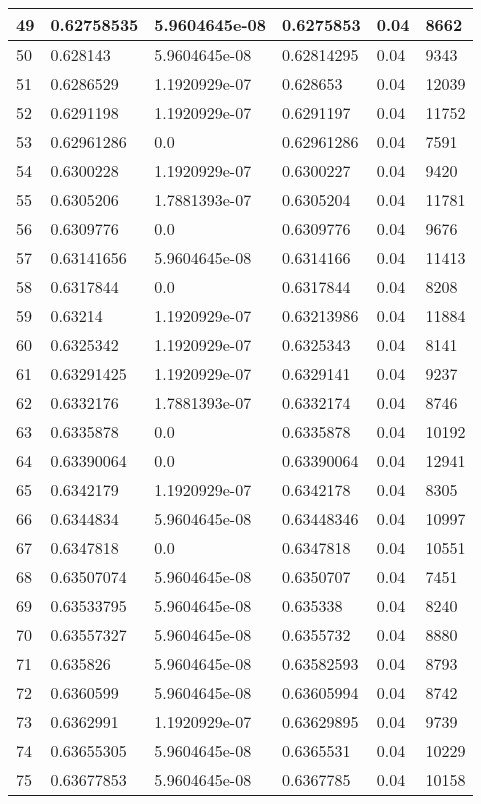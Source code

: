 \begin{longtable}{|l|l|l|l|l|l|}
49 & 0.62758535 & 5.9604645e-08 & 0.6275853 & 0.04 & 8662 \\ \hline 
50 & 0.628143 & 5.9604645e-08 & 0.62814295 & 0.04 & 9343 \\ \hline 
51 & 0.6286529 & 1.1920929e-07 & 0.628653 & 0.04 & 12039 \\ \hline 
52 & 0.6291198 & 1.1920929e-07 & 0.6291197 & 0.04 & 11752 \\ \hline 
53 & 0.62961286 & 0.0 & 0.62961286 & 0.04 & 7591 \\ \hline 
54 & 0.6300228 & 1.1920929e-07 & 0.6300227 & 0.04 & 9420 \\ \hline 
55 & 0.6305206 & 1.7881393e-07 & 0.6305204 & 0.04 & 11781 \\ \hline 
56 & 0.6309776 & 0.0 & 0.6309776 & 0.04 & 9676 \\ \hline 
57 & 0.63141656 & 5.9604645e-08 & 0.6314166 & 0.04 & 11413 \\ \hline 
58 & 0.6317844 & 0.0 & 0.6317844 & 0.04 & 8208 \\ \hline 
59 & 0.63214 & 1.1920929e-07 & 0.63213986 & 0.04 & 11884 \\ \hline 
60 & 0.6325342 & 1.1920929e-07 & 0.6325343 & 0.04 & 8141 \\ \hline 
61 & 0.63291425 & 1.1920929e-07 & 0.6329141 & 0.04 & 9237 \\ \hline 
62 & 0.6332176 & 1.7881393e-07 & 0.6332174 & 0.04 & 8746 \\ \hline 
63 & 0.6335878 & 0.0 & 0.6335878 & 0.04 & 10192 \\ \hline 
64 & 0.63390064 & 0.0 & 0.63390064 & 0.04 & 12941 \\ \hline 
65 & 0.6342179 & 1.1920929e-07 & 0.6342178 & 0.04 & 8305 \\ \hline 
66 & 0.6344834 & 5.9604645e-08 & 0.63448346 & 0.04 & 10997 \\ \hline 
67 & 0.6347818 & 0.0 & 0.6347818 & 0.04 & 10551 \\ \hline 
68 & 0.63507074 & 5.9604645e-08 & 0.6350707 & 0.04 & 7451 \\ \hline 
69 & 0.63533795 & 5.9604645e-08 & 0.635338 & 0.04 & 8240 \\ \hline 
70 & 0.63557327 & 5.9604645e-08 & 0.6355732 & 0.04 & 8880 \\ \hline 
71 & 0.635826 & 5.9604645e-08 & 0.63582593 & 0.04 & 8793 \\ \hline 
72 & 0.6360599 & 5.9604645e-08 & 0.63605994 & 0.04 & 8742 \\ \hline 
73 & 0.6362991 & 1.1920929e-07 & 0.63629895 & 0.04 & 9739 \\ \hline 
74 & 0.63655305 & 5.9604645e-08 & 0.6365531 & 0.04 & 10229 \\ \hline 
75 & 0.63677853 & 5.9604645e-08 & 0.6367785 & 0.04 & 10158 \\ \hline 
\end{longtable}